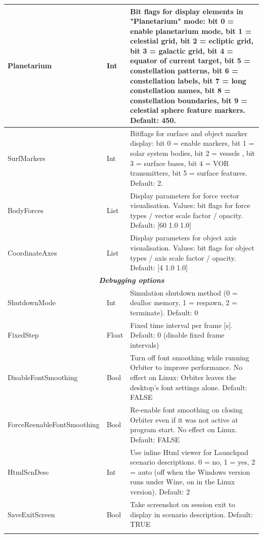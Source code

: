 \documentclass[Orbiter User Manual.tex]{subfiles}
\begin{document}
\begin{longtable}{ |p{}|p{}|p{}| }
	\hline\rule{0pt}{2ex}
	Planetarium & Int & Bit flags for display elements in "Planetarium" mode: bit 0 = enable planetarium mode, bit 1 = celestial grid, bit 2 = ecliptic grid, bit 3 = galactic grid, bit 4 = equator of current target, bit 5 = constellation patterns, bit 6 = constellation labels, bit 7 = long constellation names, bit 8 = constellation boundaries, bit 9 = celestial sphere feature markers. Default: 450.\\
	\hline\rule{0pt}{2ex}
	SurfMarkers & Int & Bitflags for surface and object marker display: bit 0 = enable markers,  bit 1 = solar system bodies, bit 2 = vessels , bit 3 = surface bases, bit 4 = VOR transmitters, bit 5 = surface features. Default: 2.\\
	\hline\rule{0pt}{2ex}
	BodyForces & List & Display parameters for force vector visualisation. Values: bit flags for force types / vector scale factor / opacity. Default: [60 1.0 1.0]\\
	\hline\rule{0pt}{2ex}
	CoordinateAxes & List & Display parameters for object axis visualisation. Values: bit flags for object types / axis scale factor / opacity. Default: [4 1.0 1.0]\\
	\hline
	\multicolumn{3}{|c|}{\rule{0pt}{2ex}\textbf{\textit{Debugging options}}}\\
	\hline\rule{0pt}{2ex}
	ShutdownMode & Int & Simulation shutdown method (0 = dealloc memory, 1 = respawn, 2 = terminate). Default: 0\\
	\hline\rule{0pt}{2ex}
	FixedStep & Float & Fixed time interval per frame [s]. Default: 0 (disable fixed frame intervals)\\
	\hline\rule{0pt}{2ex}
	DisableFontSmoothing & Bool & Turn off font smoothing while running Orbiter to improve performance. No effect on Linux: Orbiter leaves the desktop's font settings alone. Default: FALSE\\
	\hline\rule{0pt}{2ex}
	ForceReenableFontSmoothing & Bool & Re-enable font smoothing on closing Orbiter even if it was not active at program start. No effect on Linux. Default: FALSE\\
	\hline\rule{0pt}{2ex}
	HtmlScnDesc & Int & Use inline Html viewer for Launchpad scenario descriptions. 0 = no, 1 = yes, 2 = auto (off when the Windows version runs under Wine, on in the Linux version). Default: 2\\
	\hline\rule{0pt}{2ex}
	SaveExitScreen & Bool & Take screenshot on session exit to display in scenario description. Default: TRUE\\
	\hline\rule{0pt}{2ex}

\end{longtable}
\end{document}
